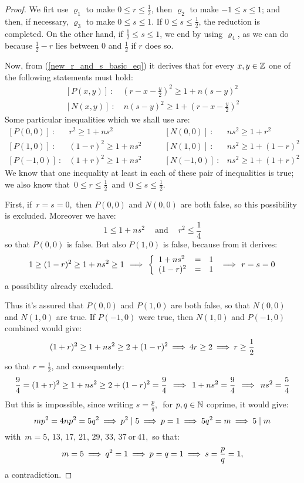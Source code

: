 \begin{proof}
We firt use $\varrho_1$ to make
$0 \leq r \leq \frac{1}{2}$, then $\varrho_2$ to make
$-1 \leq s \leq 1$; and then, if necessary, $\varrho_3$
to make $0 \leq s \leq 1$. If $0 \leq s \leq \frac{1}{2}$,
the reduction is completed. On the other hand, if
$\frac{1}{2}\leq s\leq 1$, we end by using $\varrho_4$,
as we can do because $\frac{1}{2} - r$ lies between $0$
and $\frac{1}{2}$ if $r$ does so.

Now, from (\ref{new_r_and_s_basic_eq}) it derives that
for every $x, y \in \mathbb{Z}$ one of the following
statements must hold:
%
\begin{eqnarray}
\left[P(x,y)\right]\::\quad \left(r-x-\frac{y}{2}\right)^2
\geq 1 + n(s - y)^2 \\[4pt]
\left[N(x,y)\right]\::\quad n(s - y)^2 \geq
1 + \left(r - x - \frac{y}{2}\right)^2
\end{eqnarray}
%
Some particular inequalities which we shall use are:
\begin{equation*}
\begin{array}{llll}
\left[P(0,0)\right]\:: & r^2 \geq 1 + ns^2 &
\quad\quad
\left[N(0,0)\right]\:: & ns^2 \geq 1 + r^2
\\[7pt]
\left[P(1,0)\right]\:: & (1 - r)^2 \geq 1 + ns^2 &
\quad\quad
\left[N(1,0)\right]\:: & ns^2 \geq 1 + (1 - r)^2
\\[7pt]
\left[P(-1,0)\right]\:: & (1 + r)^2 \geq 1 + ns^2 &
\quad\quad
\left[N(-1,0)\right]\:: & ns^2 \geq 1 + (1 + r)^2
\end{array}
\end{equation*}
%
We know that one inequality at least in each of these
pair of inequalities is true; we also know that\,
$0 \leq r \leq \frac{1}{2}$\, and\,
$0 \leq s \leq \frac{1}{2}$.

First, if\, $r = s = 0$,\, then $P(0,0)$ and $N(0,0)$
are both false, so this possibility is excluded.
Moreover we have:
$$
1 \leq 1 + ns^2 \quad\: \textrm{and}
\quad\: r^2 \leq \frac{1}{4}
$$
so that $P(0,0)$ is false.
But also $P(1,0)$ is false, because from it derives:
$$
1 \geq (1 - r)^2 \geq 1 + ns^2 \geq 1 \,\:\Longrightarrow\:\,
\left\{
\begin{array}{lll}
1 + ns^2 & = & 1 \\
(1 - r)^2 & = & 1
\end{array}
\,\:\Longrightarrow\:\,
r = s = 0
\right.
$$
a possibility already excluded.

Thus it's assured that $P(0,0)$ and $P(1,0)$ are both
false, so that $N(0,0)$ and $N(1,0)$ are true.
If $P(-1, 0)$ were true, then $N(1, 0)$ and
$P(-1, 0)$ combined would give:
$$
(1 + r)^2 \geq 1 + ns^2 \geq 2 + (1 - r)^2 \:\Longrightarrow\:
4r \geq 2 \:\Longrightarrow\: r \geq \frac{1}{2}
$$
so that $r = \frac{1}{2}$, and consequentely:
$$
\frac{9}{4} = (1 + r)^2 \geq 1 + ns^2 \geq
2 + (1 - r)^2 = \frac{9}{4} \:\:\Longrightarrow\:\:
1 + ns^2 = \frac{9}{4} \:\:\Longrightarrow\:\: ns^2 = \frac{5}{4}
$$
But this is impossible, since writing
$s = \frac{p}{q},\,$ for $p, q \in \mathbb{N}$ coprime,
it would give:
$$
mp^2 = 4np^2 = 5q^2 \:\Longrightarrow\: p^2 \mid 5 \:\Longrightarrow\: p=1
\:\Longrightarrow\: 5q^2 = m \:\Longrightarrow\: 5 \mid m
$$
with\, $m = 5,\, 13,\, 17,\, 21,\, 29,\, 33,\, 37
\ \textrm{or} \ 41$,\, so that:
$$
m = 5 \:\Longrightarrow\: q^2 = 1 \:\Longrightarrow\: p = q = 1 \:\Longrightarrow\:
s = \frac{p}{q} = 1,
$$
a contradiction.


\end{proof}

